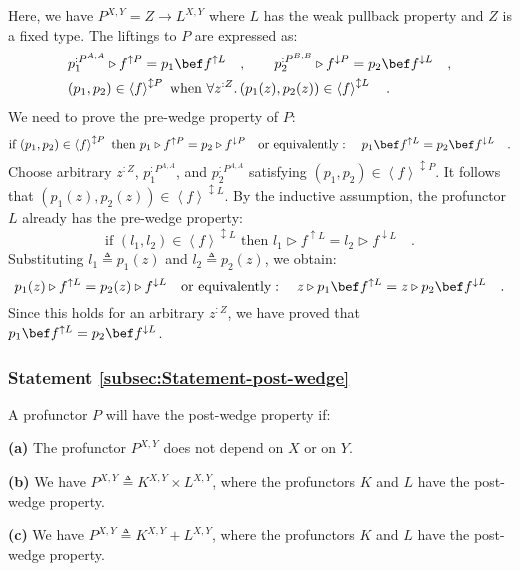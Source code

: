 Here, we have $P^{X,Y}=Z\rightarrow L^{X,Y}$ where $L$ has the weak
pullback property and $Z$ is a fixed type. The liftings to $P$ are
expressed as:
\begin{align*}
 & p_{1}^{:P^{A,A}}\triangleright f^{\uparrow P}=p_{1}\bef f^{\uparrow L}\quad,\quad\quad p_{2}^{:P^{B,B}}\triangleright f^{\downarrow P}=p_{2}\bef f^{\downarrow L}\quad,\\
 & (p_{1},p_{2})\in\left<f\right>^{\updownarrow P}\text{ when }\forall z^{:Z}.\,(p_{1}(z),p_{2}(z))\in\left<f\right>^{\updownarrow L}\quad.
\end{align*}
We need to prove the pre-wedge property of $P$:
\[
\text{if }(p_{1},p_{2})\in\left<f\right>^{\updownarrow P}\text{ then }p_{1}\triangleright f^{\uparrow P}=p_{2}\triangleright f^{\downarrow P}\quad\text{or equivalently}:\quad p_{1}\bef f^{\uparrow L}=p_{2}\bef f^{\downarrow L}\quad.
\]
Choose arbitrary $z^{:Z}$, $p_{1}^{:P^{A,A}}$, and $p_{2}^{:P^{A,A}}$
satisfying $(p_{1},p_{2})\in\left<f\right>^{\updownarrow P}$. It
follows that $(p_{1}(z),p_{2}(z))\in\left<f\right>^{\updownarrow L}$.
By the inductive assumption, the profunctor $L$ already has the pre-wedge
property:
\[
\text{if }(l_{1},l_{2})\in\left<f\right>^{\updownarrow L}\text{ then }l_{1}\triangleright f^{\uparrow L}=l_{2}\triangleright f^{\downarrow L}\quad.
\]
Substituting $l_{1}\triangleq p_{1}(z)$ and $l_{2}\triangleq p_{2}(z)$,
we obtain: 
\[
p_{1}(z)\triangleright f^{\uparrow L}=p_{2}(z)\triangleright f^{\downarrow L}\quad\text{or equivalently}:\quad z\triangleright p_{1}\bef f^{\uparrow L}=z\triangleright p_{2}\bef f^{\downarrow L}\quad.
\]
Since this holds for an arbitrary $z^{:Z}$, we have proved that $p_{1}\bef f^{\uparrow L}=p_{2}\bef f^{\downarrow L}$.

\subsubsection{Statement \label{subsec:Statement-post-wedge}\ref{subsec:Statement-post-wedge}}

A profunctor $P$ will have the post-wedge property if:

\textbf{(a)} The profunctor $P^{X,Y}$ does not depend on $X$ or
on $Y$.

\textbf{(b)} We have $P^{X,Y}\triangleq K^{X,Y}\times L^{X,Y}$, where
the profunctors $K$ and $L$ have the post-wedge property.

\textbf{(c)} We have $P^{X,Y}\triangleq K^{X,Y}+L^{X,Y}$, where the
profunctors $K$ and $L$ have the post-wedge property.

